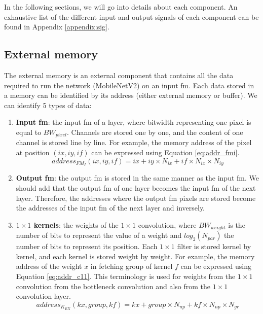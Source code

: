 In the following sections, we will go into details about each component. An exhaustive list of the different input and output signals of each component can be found in Appendix \ref{appendix:sig}.
%
\subsection{External memory} \label{subs:extmem}
%
The external memory is an external component that contains all the data required to run the network (MobileNetV2) on an input \acrshort{fm}. Each data stored in a memory can be identified by its address (either external memory or buffer). We can identify 5 types of data:
%
\begin{enumerate}
    \item \textbf{Input \acrshort{fm}}: the input \acrshort{fm} of a layer, where bitwidth representing one pixel is equal to $BW_{pixel}$. Channels are stored one by one, and the content of one channel is stored line by line. For example, the memory address of the pixel at position $\left(ix, iy, if\right)$ can be expressed using Equation \eqref{eq:addr_fmi}.
    \begin{equation}
        address_{FM_{I}}(ix, iy, if) = ix + iy \times N_{ix} + if \times N_{ix} \times N_{iy}
        \label{eq:addr_fmi}
    \end{equation}
    \item \textbf{Output \acrshort{fm}}: the output \acrshort{fm} is stored in the same manner as the input \acrshort{fm}. We should add that the output \acrshort{fm} of one layer becomes the input \acrshort{fm} of the next layer. Therefore, the addresses where the output \acrshort{fm} pixels are stored become the addresses of the input \acrshort{fm} of the next layer and inversely.
    \item \textbf{$1 \times 1$ kernels}: the weights of the $1 \times 1$ convolution, where $BW_{weight}$ is the number of bits to represent the value of a weight and $log_2(N_{par})$ the number of bits to represent its position. Each $1 \times 1$ filter is stored kernel by kernel, and each kernel is stored weight by weight. For example, the memory address of the weight $x$ in fetching group  of kernel $f$ can be expressed using Equation \eqref{eq:addr_c11}.
    This terminology is used for weights from the $1 \times 1$ convolution from the bottleneck convolution and also from the $1 \times 1$ convolution layer.
    \begin{equation}
        address_{K_{EX}}(kx, group, kf) = kx + group \times N_{np} + kf \times N_{np} \times N_{gr}

\end{equation}
\end{enumerate}
